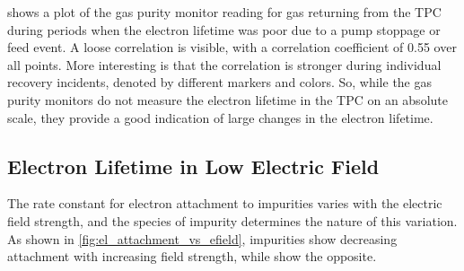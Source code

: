 \documentclass[herrin-thesis.tex]{subfiles}
\begin{document}
 shows a plot of the gas purity monitor reading for gas returning from the TPC during periods when the electron lifetime was poor due to a pump stoppage or feed event. A loose correlation is visible, with a correlation coefficient of 0.55 over all points. More interesting is that the correlation is stronger during individual recovery incidents, denoted by different markers and colors. So, while the gas purity monitors do not measure the electron lifetime in the TPC on an absolute scale, they provide a good indication of large changes in the electron lifetime.

\subsection{Electron Lifetime in Low Electric Field}
\label{subsec:el_lowfield}
The rate constant for electron attachment to impurities varies with the electric field strength, and the species of impurity determines the nature of this variation. As shown in \cref{fig:el_attachment_vs_efield}\cite{Bakale:1976ly},  impurities show decreasing attachment with increasing field strength, while  show the opposite.
\end{document}
